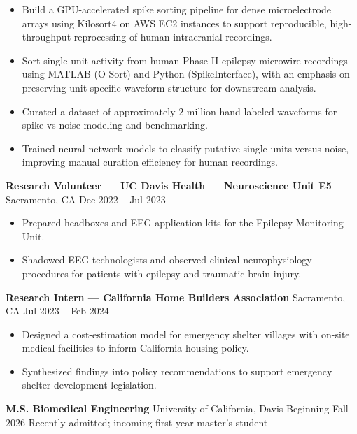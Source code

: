 \documentclass[11pt]{article}
\providecommand{\tightlist}{\setlength{\itemsep}{0pt}\setlength{\parskip}{0pt}}
\renewcommand{\subsection}[1]{\par\medskip\noindent{\sffamily\bfseries\fontsize{11pt}{0}\selectfont #1}\par\smallskip}
\begin{document}
\begin{itemize}
\tightlist
\item
  Build a GPU-accelerated spike sorting pipeline for dense
  microelectrode arrays using Kilosort4 on AWS EC2 instances to support
  reproducible, high-throughput reprocessing of human intracranial
  recordings.
\item
  Sort single-unit activity from human Phase II epilepsy microwire
  recordings using MATLAB (O-Sort) and Python (SpikeInterface), with an
  emphasis on preserving unit-specific waveform structure for downstream
  analysis.
\item
  Curated a dataset of approximately 2 million hand-labeled waveforms
  for spike-vs-noise modeling and benchmarking.
\item
  Trained neural network models to classify putative single units versus
  noise, improving manual curation efficiency for human recordings.
\end{itemize}

\textbf{Research Volunteer --- UC Davis Health --- Neuroscience Unit E5}
\textbar{} Sacramento, CA \textbar{} Dec 2022 -- Jul 2023

\begin{itemize}
\tightlist
\item
  Prepared headboxes and EEG application kits for the Epilepsy
  Monitoring Unit.
\item
  Shadowed EEG technologists and observed clinical neurophysiology
  procedures for patients with epilepsy and traumatic brain injury.
\end{itemize}

\textbf{Research Intern --- California Home Builders Association}
\textbar{} Sacramento, CA \textbar{} Jul 2023 -- Feb 2024

\begin{itemize}
\tightlist
\item
  Designed a cost-estimation model for emergency shelter villages with
  on-site medical facilities to inform California housing policy.
\item
  Synthesized findings into policy recommendations to support emergency
  shelter development legislation.
\end{itemize}

\subsection{Education}\label{education-1}

\textbf{M.S. Biomedical Engineering} \textbar{} University of
California, Davis \textbar{} Beginning Fall 2026 Recently admitted;
incoming first-year master's student
\end{document}
